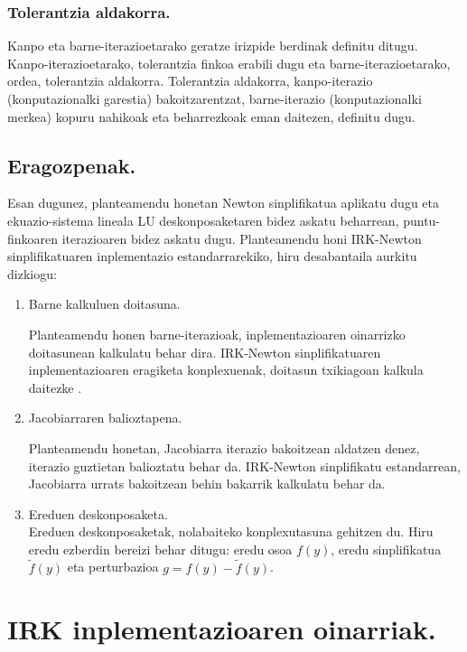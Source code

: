 \subsubsection*{Tolerantzia aldakorra.}

Kanpo eta barne-iterazioetarako geratze irizpide berdinak definitu ditugu. Kanpo-iterazioetarako, tolerantzia finkoa erabili dugu eta barne-iterazioetarako, ordea, tolerantzia aldakorra. Tolerantzia aldakorra, kanpo-iterazio (konputazionalki garestia) bakoitzarentzat, barne-iterazio (konputazionalki merkea) kopuru nahikoak eta beharrezkoak eman daitezen, definitu dugu.     
 

\subsection*{Eragozpenak.}
Esan dugunez, planteamendu honetan Newton sinplifikatua aplikatu dugu eta ekuazio-sistema lineala LU deskonposaketaren bidez askatu beharrean, puntu-finkoaren iterazioaren bidez askatu dugu. Planteamendu honi IRK-Newton sinplifikatuaren inplementazio estandarrarekiko, hiru desabantaila aurkitu dizkiogu: 
\begin{enumerate}
\item Barne kalkuluen doitasuna. 

Planteamendu honen barne-iterazioak, inplementazioaren oinarrizko doitasunean kalkulatu behar dira.
IRK-Newton sinplifikatuaren inplementazioaren eragiketa konplexuenak, doitasun txikiagoan kalkula daitezke \cite{Baboulin20092526}. 

\item Jacobiarraren balioztapena.

Planteamendu honetan, Jacobiarra iterazio bakoitzean aldatzen denez, iterazio guztietan balioztatu behar da.
IRK-Newton sinplifikatu estandarrean, Jacobiarra urrats bakoitzean behin bakarrik kalkulatu behar da. 

\item Ereduen deskonposaketa.\\
Ereduen deskonposaketak, nolabaiteko konplexutasuna gehitzen du. Hiru eredu ezberdin bereizi behar ditugu: eredu osoa $f(y)$, eredu sinplifikatua $\tilde{f}(y)$ eta perturbazioa  $g=f(y)-\tilde{f}(y)$. 
\end{enumerate}

\section{IRK inplementazioaren oinarriak.}


